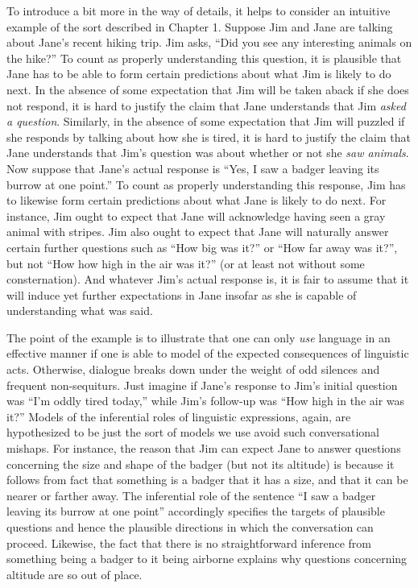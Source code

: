 To introduce a bit more in the way of details, it helps to consider an intuitive example of the sort described in Chapter 1. Suppose Jim and Jane are talking about Jane's recent hiking trip. Jim asks, ``Did you see any interesting animals on the hike?'' To count as properly understanding this question, it is plausible that Jane has to be able to form certain predictions about what Jim is likely to do next. In the absence of some expectation that Jim will be taken aback if she does not respond, it is hard to justify the claim that Jane understands that Jim \textit{asked a question}. Similarly, in the absence of some expectation that Jim will puzzled if she responds by talking about how she is tired, it is hard to justify the claim that Jane understands that Jim's question was about whether or not she \textit{saw animals}. Now suppose that Jane's actual response is ``Yes, I saw a badger leaving its burrow at one point.'' To count as properly understanding this response, Jim has to likewise form certain predictions about what Jane is likely to do next. For instance, Jim ought to expect that Jane will acknowledge having seen a gray animal with stripes. Jim also ought to expect that Jane will naturally answer certain further questions such as ``How big was it?'' or ``How far away was it?'', but not ``How how high in the air was it?'' (or at least not without some consternation). And whatever Jim's actual response is, it is fair to assume that it will induce yet further expectations in Jane insofar as she is capable of understanding what was said. 

The point of the example is to illustrate that one can only \textit{use} language in an effective manner if one is able to model of the expected consequences of linguistic acts. Otherwise, dialogue breaks down under the weight of odd silences and frequent non-sequiturs. Just imagine if Jane's response to Jim's initial question was ``I'm oddly tired today,'' while Jim's follow-up was ``How high in the air was it?'' Models of the inferential roles of linguistic expressions, again, are hypothesized to be just the sort of models we use avoid such conversational mishaps. For instance, the reason that Jim can expect Jane to answer questions concerning the size and shape of the badger (but not its altitude) is because it follows from fact that something is a badger that it has a size, and that it can be nearer or farther away. The inferential role of the sentence ``I saw a badger leaving its burrow at one point'' accordingly specifies the targets of plausible questions and hence the plausible directions in which the conversation can proceed. Likewise, the fact that there is no straightforward inference from something being a badger to it being airborne explains why questions concerning altitude are so out of place.

